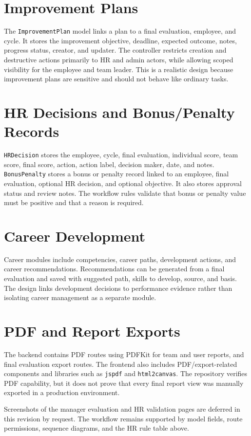 \section{Improvement Plans}
The \texttt{ImprovementPlan} model links a plan to a final evaluation, employee, and cycle. It stores the improvement objective, deadline, expected outcome, notes, progress status, creator, and updater. The controller restricts creation and destructive actions primarily to HR and admin actors, while allowing scoped visibility for the employee and team leader. This is a realistic design because improvement plans are sensitive and should not behave like ordinary tasks.

\section{HR Decisions and Bonus/Penalty Records}
\texttt{HRDecision} stores the employee, cycle, final evaluation, individual score, team score, final score, action, action label, decision maker, date, and notes. \texttt{BonusPenalty} stores a bonus or penalty record linked to an employee, final evaluation, optional HR decision, and optional objective. It also stores approval status and review notes. The workflow rules validate that bonus or penalty value must be positive and that a reason is required.

\section{Career Development}
Career modules include competencies, career paths, development actions, and career recommendations. Recommendations can be generated from a final evaluation and saved with suggested path, skills to develop, source, and basis. The design links development decisions to performance evidence rather than isolating career management as a separate module.

\section{PDF and Report Exports}
The backend contains PDF routes using PDFKit for team and user reports, and final evaluation export routes. The frontend also includes PDF/export-related components and libraries such as \texttt{jspdf} and \texttt{html2canvas}. The repository verifies PDF capability, but it does not prove that every final report view was manually exported in a production environment.

Screenshots of the manager evaluation and HR validation pages are deferred in this revision by request. The workflow remains supported by model fields, route permissions, sequence diagrams, and the HR rule table above.

